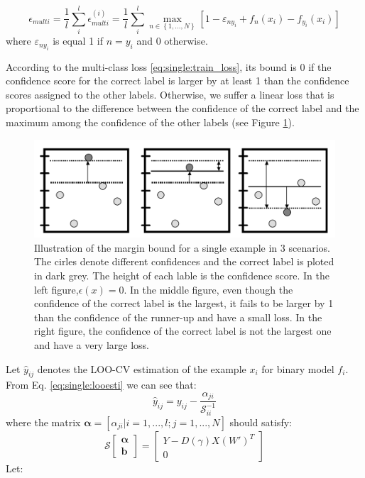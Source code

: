 \begin{equation}\label{eq:single:train_loss}
\epsilon _{multi} = \frac{1}{l} \sum_{i}^{l}\epsilon^{(i)} _{multi} =\frac{1}{l} \sum_{i}^{l} \mathop {\max }\limits_{n \in \left\lbrace 1,...,N \right\rbrace } {\left[ {1 - {\varepsilon _{n{y_i}}} + {{f_n(x_i)} - f_{y_i}(x_i)}} \right]}
\end{equation}
where $\varepsilon_{n{y_i}}$ is equal 1 if $n=y_i$ and 0 otherwise. 

According to the multi-class loss \eqref{eq:single:train_loss}, its bound is 0 if the confidence score for the correct label is larger by at least 1 than the confidence scores assigned to the other labels. Otherwise, we suffer a linear loss that is proportional to the difference between the confidence of the correct label and the maximum among the confidence of the other labels (see Figure \ref{fig:single:multi-loss}). 
\begin{figure}
	\centering
	\includegraphics[scale=.5]{transfer/fig/svmloss.png}
	\caption{Illustration of the margin bound for a single example in 3 scenarios. The cirles denote different confidences and the correct label is ploted in dark grey. The height of each lable is the confidence score. In the left figure,$\epsilon(x)=0$. In the middle figure, even though the confidence of the correct label is the largest, it fails to be larger by 1 than the confidence of the runner-up and have a small loss. In the right figure, the confidence of the correct label is not the largest one and have a very large loss.}\label{fig:single:multi-loss}
\end{figure}

Let $\hat{y}_{ij}$ denotes the LOO-CV estimation of the example $x_i$ for binary model $f_i$. From Eq. \eqref{eq:single:looesti} we can see that:
\begin{equation}
\hat{y}_{ij} = y_{ij}-\frac{\alpha_{ji}}{\mathcal{S}^{-1}_{ii}}
\end{equation}
where the matrix $\boldsymbol{\alpha} = [\alpha_{ji}|i=1,...,l;j=1,...,N]$ should satisfy:
\begin{equation}
	\mathcal{S}\left[ {\begin{array}{*{20}{c}}
		\boldsymbol{\alpha} \\
		\boldsymbol{b}
		\end{array}} \right] = \left[ {\begin{array}{*{20}{c}}
		{Y - D(\gamma) X{{\left( {W'} \right)}^T}}\\
		0
		\end{array}} \right]
\end{equation}
Let:

